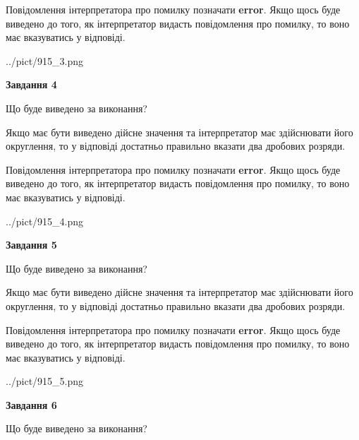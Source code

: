 \documentclass[12pt, ukrainian]{article}
\begin{document}
{\begin {Large}
Повідомлення інтерпретатора про помилку позначати \textbf{error}.
Якщо щось буде виведено до того, як інтерпретатор видасть повідомлення про помилку, 
то воно має вказуватись у відповіді. \par

\begin{center}
	{../pict/915_3.png}
\end{center}
\newpage

{\begin {center}\textbf{Завдання 4}\end {center}}\par
Що буде виведено за виконання? \par

Якщо має бути виведено дійсне значення та інтерпретатор має здійснювати його округлення, 
то у відповіді достатньо правильно вказати два дробових розряди.

Повідомлення інтерпретатора про помилку позначати \textbf{error}.
Якщо щось буде виведено до того, як інтерпретатор видасть повідомлення про помилку, 
то воно має вказуватись у відповіді. \par

\begin{center}
	{../pict/915_4.png}
\end{center}
\newpage

{\begin {center}\textbf{Завдання 5}\end {center}}\par
Що буде виведено за виконання? \par

Якщо має бути виведено дійсне значення та інтерпретатор має здійснювати його округлення, 
то у відповіді достатньо правильно вказати два дробових розряди.

Повідомлення інтерпретатора про помилку позначати \textbf{error}.
Якщо щось буде виведено до того, як інтерпретатор видасть повідомлення про помилку, 
то воно має вказуватись у відповіді. \par

\begin{center}
	{../pict/915_5.png}
\end{center}
\newpage

{\begin {center}\textbf{Завдання 6}\end {center}}\par
Що буде виведено за виконання? \par


\end{Large}}
\end{document}

